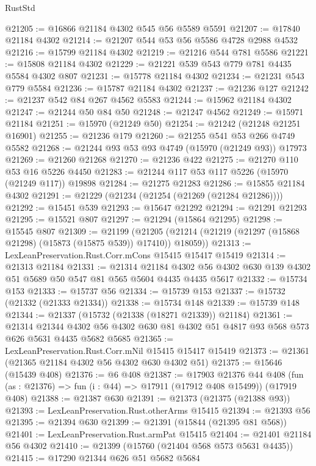 \begin{lexlean}{RustStd}
\begin{coremodule}
@21205 := @16866 @21184 @4302 @545 @56 @5589 @5591
@21207 := @17840 @21184 @4302
@21214 := @21207 @544 @53 @56 @5586 @4728 @2988 @4532
@21216 := @15799 @21184 @4302
@21219 := @21216 @544 @781 @5586
@21221 := @15808 @21184 @4302
@21229 := @21221 @539 @543 @779 @781 @4435 @5584 @4302 @807
@21231 := @15778 @21184 @4302
@21234 := @21231 @543 @779 @5584
@21236 := @15787 @21184 @4302
@21237 := @21236 @127
@21242 := @21237 @542 @84 @267 @4562 @5583
@21244 := @15962 @21184 @4302
@21247 := @21244 @50 @84 @50
@21248 := @21247 @4562
@21249 := @15971 @21184
@21251 := @15970 (@21249 @50)
@21254 := @21242 (@21248 @21251 @16901)
@21255 := @21236 @179
@21260 := @21255 @541 @53 @266 @4749 @5582
@21268 := @21244 @93 @53 @93 @4749 (@15970 (@21249 @93)) @17973
@21269 := @21260 @21268
@21270 := @21236 @422
@21275 := @21270 @110 @53 @16 @5226 @4450
@21283 := @21244 @117 @53 @117 @5226 (@15970 (@21249 @117)) @19898
@21284 := @21275 @21283
@21286 := @15855 @21184 @4302
@21291 := @21229 (@21234 (@21254 (@21269 (@21284 @21286))))
@21292 := @15451 @539
@21293 := @15647 @21292
@21294 := @21291 @21293
@21295 := @15521 @807
@21297 := @21294 (@15864 @21295)
@21298 := @15545 @807
@21309 := @21199
    (@21205 (@21214 (@21219 (@21297 (@15868 @21298) (@15873 (@15875 @539)) @17410)) @18059))
@21313 := LexLeanPreservation.Rust.Corr.mCons @15415 @15417 @15419
@21314 := @21313 @21184
@21331 := @21314
    @21184
    @4302
    @56
    @4302
    @630
    @139
    @4302
    @51
    @5689
    @50
    @547
    @81
    @565
    @5604
    @4435
    @4435
    @5617
@21332 := @15734 @153
@21333 := @15737 @56
@21334 := @15739 @153
@21337 := @15732 (@21332 (@21333 @21334))
@21338 := @15734 @148
@21339 := @15739 @148
@21344 := @21337 (@15732 (@21338 (@18271 @21339)) @21184)
@21361 := @21314
    @21344
    @4302
    @56
    @4302
    @630
    @81
    @4302
    @51
    @4817
    @93
    @568
    @573
    @626
    @5631
    @4435
    @5682
    @5685
@21365 := LexLeanPreservation.Rust.Corr.mNil @15415 @15417 @15419
@21373 := @21361 (@21365 @21184 @4302 @56 @4302 @630 @4302 @51)
@21375 := @15646 (@15439 @408)
@21376 := @6 @408
@21387 := @17903
    @21376
    @44
    @408
    (fun (as : @21376) => fun (i : @44) => @17911 (@17912 @408 @15499))
    (@17919 @408)
@21388 := @21387 @630
@21391 := @21373 (@21375 (@21388 @93))
@21393 := LexLeanPreservation.Rust.otherArms @15415
@21394 := @21393 @56
@21395 := @21394 @630
@21399 := @21391 (@15844 (@21395 @81 @568))
@21401 := LexLeanPreservation.Rust.armPat @15415
@21404 := @21401 @21184 @56 @4302
@21410 := @21399 (@15760 (@21404 @568 @573 @5631 @4435))
@21415 := @17290 @21344 @626 @51 @5682 @5684

\end{coremodule}
\end{lexlean}

